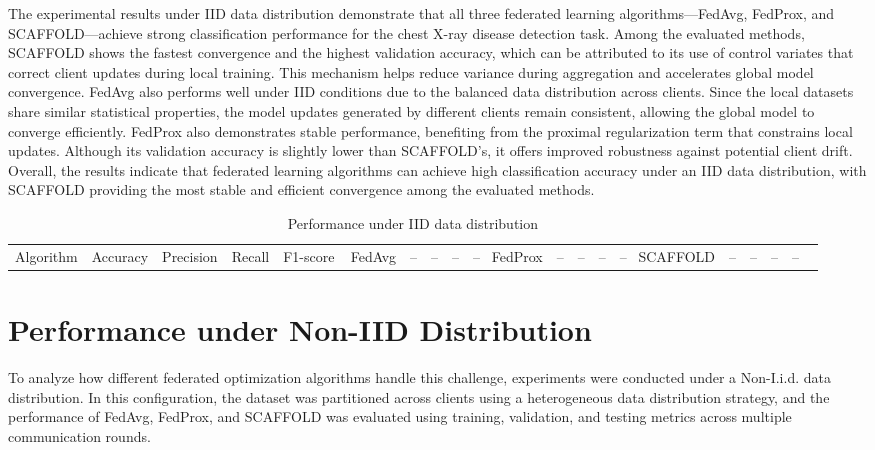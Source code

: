 \documentclass[12pt]{book}
\begin{document}
The experimental results under IID data distribution demonstrate that all three federated learning algorithms—FedAvg, FedProx, and SCAFFOLD—achieve strong classification performance for the chest X-ray disease detection task.
Among the evaluated methods, SCAFFOLD shows the fastest convergence and the highest validation accuracy, which can be attributed to its use of control variates that correct client updates during local training. This mechanism helps reduce variance during aggregation and accelerates global model convergence.
FedAvg also performs well under IID conditions due to the balanced data distribution across clients. Since the local datasets share similar statistical properties, the model updates generated by different clients remain consistent, allowing the global model to converge efficiently.
FedProx also demonstrates stable performance, benefiting from the proximal regularization term that constrains local updates. Although its validation accuracy is slightly lower than SCAFFOLD's, it offers improved robustness against potential client drift.
Overall, the results indicate that federated learning algorithms can achieve high classification accuracy under an IID data distribution, with SCAFFOLD providing the most stable and efficient convergence among the evaluated methods.

\begin{table}[H]
\centering
\caption{Performance under IID data distribution}
\label{tab:iid_results}
\begin{tabular}{lcccc}
\toprule
Algorithm & Accuracy & Precision & Recall & F1-score \
\midrule
FedAvg & – & – & – & – \
FedProx & – & – & – & – \
SCAFFOLD & – & – & – & – \
\bottomrule
\end{tabular}
\end{table}

\section{Performance under Non-IID Distribution}

To analyze how different federated optimization algorithms handle this challenge, experiments were conducted under a Non-I.i.d. data distribution. In this configuration, the dataset was partitioned across clients using a heterogeneous data distribution strategy, and the performance of FedAvg, FedProx, and SCAFFOLD was evaluated using training, validation, and testing metrics across multiple communication rounds.
\end{document}
